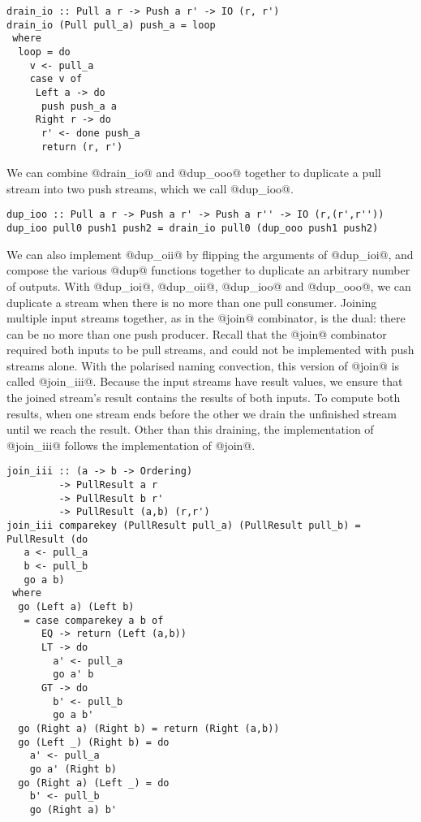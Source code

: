 \begin{lstlisting}
drain_io :: Pull a r -> Push a r' -> IO (r, r')
drain_io (Pull pull_a) push_a = loop
 where
  loop = do
    v <- pull_a
    case v of
     Left a -> do
      push push_a a
     Right r -> do
      r' <- done push_a
      return (r, r')
\end{lstlisting}

We can combine @drain_io@ and @dup_ooo@ together to duplicate a pull stream into two push streams, which we call @dup_ioo@.

\begin{lstlisting}
dup_ioo :: Pull a r -> Push a r' -> Push a r'' -> IO (r,(r',r''))
dup_ioo pull0 push1 push2 = drain_io pull0 (dup_ooo push1 push2)
\end{lstlisting}

We can also implement @dup_oii@ by flipping the arguments of @dup_ioi@, and compose the various @dup@ functions together to duplicate an arbitrary number of outputs.
With @dup_ioi@, @dup_oii@, @dup_ioo@ and @dup_ooo@, we can duplicate a stream when there is no more than one pull consumer.
Joining multiple input streams together, as in the @join@ combinator, is the dual: there can be no more than one push producer.
Recall that the @join@ combinator required both inputs to be pull streams, and could not be implemented with push streams alone.
With the polarised naming convection, this version of @join@ is called @join_iii@.
Because the input streams have result values, we ensure that the joined stream's result contains the results of both inputs.
To compute both results, when one stream ends before the other we drain the unfinished stream until we reach the result.
Other than this draining, the implementation of @join_iii@ follows the implementation of @join@.

\begin{lstlisting}
join_iii :: (a -> b -> Ordering)
         -> PullResult a r
         -> PullResult b r'
         -> PullResult (a,b) (r,r')
join_iii comparekey (PullResult pull_a) (PullResult pull_b) = PullResult (do
   a <- pull_a
   b <- pull_b
   go a b)
 where
  go (Left a) (Left b)
   = case comparekey a b of
      EQ -> return (Left (a,b))
      LT -> do
        a' <- pull_a
        go a' b
      GT -> do
        b' <- pull_b
        go a b'
  go (Right a) (Right b) = return (Right (a,b))
  go (Left _) (Right b) = do
    a' <- pull_a
    go a' (Right b)
  go (Right a) (Left _) = do
    b' <- pull_b
    go (Right a) b'
\end{lstlisting}


